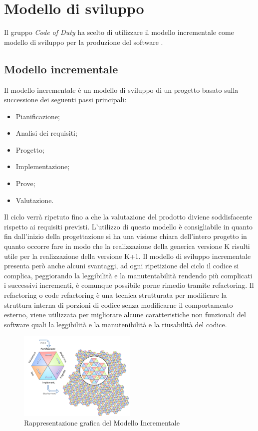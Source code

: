 \section{Modello di sviluppo}
Il gruppo \emph{Code of Duty} ha scelto di utilizzare il modello incrementale come modello di sviluppo per la produzione del software \hd .
\subsection{Modello incrementale}
Il modello incrementale è un modello di sviluppo di un progetto basato sulla successione dei seguenti passi principali:
\begin{itemize}
	\item Pianificazione;
	\item Analisi dei requisiti;
	\item Progetto;
	\item Implementazione;
	\item Prove;
	\item Valutazione.
\end{itemize}
Il ciclo verrà ripetuto fino a che la valutazione del prodotto diviene soddisfacente rispetto ai requisiti previsti.
L'utilizzo di questo modello è consigliabile in quanto fin dall'inizio della progettazione si ha una visione chiara 
dell'intero progetto in quanto occorre fare in modo che la realizzazione della generica versione K risulti utile per 
la realizzazione della versione K+1.
Il modello di sviluppo incrementale presenta però anche alcuni svantaggi, ad ogni ripetizione del ciclo il codice si complica, 
peggiorando la leggibilità e la manutentabilità rendendo più complicati i successivi incrementi, è comunque possibile porne rimedio tramite refactoring.
Il refactoring o code refactoring è una tecnica strutturata per modificare la struttura interna di porzioni di codice senza modificarne
il comportamento esterno, viene utilizzata per migliorare alcune caratteristiche non funzionali del software quali la leggibilità e la manutenibilità e la riusabilità del codice.
\begin{figure}[H]
        \centering
        \includegraphics[width=0.5\textwidth]{source/img/modelloincrementale.png}
        \caption{Rappresentazione grafica del Modello Incrementale}
\end{figure}
